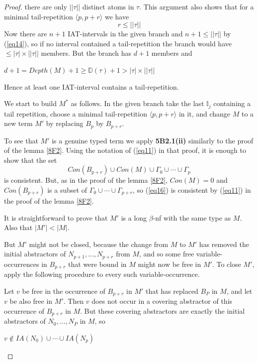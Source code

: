 \documentclass[a4paper,10pt]{article}
\begin{document}
\begin{lem}
\begin{proof}
there are only $||\tau||$ distinct atoms in $\tau$. This argument also shows that for a minimal tail-repetition 
$\langle p, p + r\rangle$ we have 
\begin{equation}\label{eq15}
 r \leq ||\tau||
\end{equation}
Now there are $n + 1$ IAT-intervals in the given branch and $n + 1 \leq ||\tau||$ by (\ref{eq14}), so if
no interval contained a tail-repetition the branch would have $\leq |\tau| \times ||\tau||$ members.
But the branch has $d + 1$ members and
\begin{center}
 $d + 1 = Depth(M) + 1 \geq \mathbb{D}(\tau) + 1 >  |\tau| \times ||\tau||$ 
\end{center}
Hence at least one IAT-interval contains a tail-repetition.

We start to build $M^*$  as follows. In the given branch take the last $\mathbb{I}_j$ containing a tail repetition,
choose a minimal tail-repetition $\langle p, p + r\rangle$ in it, and change $M$ to a new term $M'$ by replacing $B_p$ by $B_{p + r}$.

To see that $M'$ is a genuine typed term we apply \textbf{5B2.1(ii)} similarly to the proof
of the lemma \ref{8F2}. Using the notation of (\ref{eq11}) in that proof, it is enough to show that the set
\begin{equation}\label{eq16}
 Con(B_{p+r})\cup Con(M)\cup\Gamma_0\cup\cdots\cup\Gamma_p
\end{equation}
is consistent. But, as in the proof of the lemma \ref{8F2}, $Con(M) = 0$ and $Con(B_{p+r})$ is a subset of
$\Gamma_0\cup\cdots\cup\Gamma_{p + r}$, so (\ref{eq16}) is consistent by (\ref{eq11}) in the proof of the lemma \ref{8F2}.

It is straightforward to prove that $M'$ is a long $\beta$-nf with the same type as $M$.
Also that $|M'| < |M|$.

But $M'$ might not be closed, because the change from $M$ to $M'$ has removed the
initial abstractors of $N_{p+1},...,N_{p+r}$ from $M$, and so some free variable-occurrences
in $B_{p+r}$ that were bound in $M$ might now be free in $M'$. To close $M'$, apply the
following procedure to every such variable-occurrence.

Let $v$ be free in the occurrence of $B_{p+r}$ in $M'$ that has replaced $B_P$ in $M$, and let $v$
be also free in $M'$. Then $v$ does not occur in a covering abstractor of this occurrence
of $B_{p+r}$ in $M$. But these covering abstractors are exactly the initial abstractors of
$N_0, ..., N_P$ in $M$, so
\begin{center}
 $v \notin IA(N_0)\cup\cdots\cup IA(N_p)$
\end{center}


\end{proof}
\end{lem}
\end{document}
